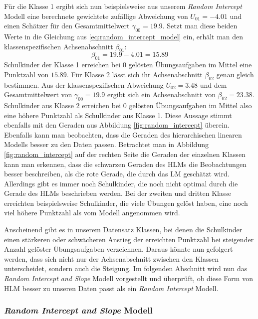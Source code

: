 \documentclass[12pt]{article}\usepackage[]{graphicx}\usepackage[]{color}
\begin{document}
Für die Klasse 1 ergibt sich nun beispielsweise aus unserem \textit{Random Intercept} Modell eine berechnete gewichtete zufällige Abweichung von $U_{01} = -4.01$ und einen Schätzer für den Gesamtmittelwert $\gamma_{00} = 19.9$. Setzt man diese beiden Werte in die Gleichung aus \eqref{eq:random_intercept_model} ein, erhält man den klassenspezifischen Achsenabschnitt $\beta_{01}$:
\begin{equation}
\beta_{01} = 19.9 - 4.01 = 15.89
\end{equation} 
Schulkinder der Klasse 1 erreichen bei $0$ gelösten Übungsaufgaben im Mittel eine Punktzahl von $15.89$. Für Klasse 2 lässt sich ihr Achsenabschnitt $\beta_{02}$ genau gleich bestimmen. Aus der klassenspezifischen Abweichung $U_{02} = 3.48$ und dem Gesamtmittelwert von $\gamma_{00} = 19.9$ ergibt sich ein Achsenabschnitt von $\beta_{02} = 23.38$. Schulkinder aus Klasse 2 erreichen bei 0 gelösten Übungsaufgaben im Mittel also eine höhere Punktzahl als Schulkinder aus Klasse 1. Diese Aussage stimmt ebenfalls mit den Geraden aus Abbildung \ref{fig:random_intercept} überein. Ebenfalls kann man beobachten, dass die Geraden des hierarchischen linearen Modells besser zu den Daten passen. Betrachtet man in Abbildung \ref{fig:random_intercept} auf der rechten Seite die Geraden der einzelnen Klassen kann man erkennen, dass die schwarzen Geraden des HLMs die Beobachtungen besser beschreiben, als die rote Gerade, die durch das LM geschätzt wird. Allerdings gibt es immer noch Schulkinder, die noch nicht optimal durch die Gerade des HLMs beschrieben werden. Bei der zweiten und dritten Klasse erreichten beispielsweise Schulkinder, die viele Übungen gelöst haben, eine noch viel höhere Punktzahl als vom Modell angenommen wird. 

Anscheinend gibt es in unserem Datensatz Klassen, bei denen die Schulkinder einen stärkeren oder schwächeren Anstieg der erreichten Punktzahl bei steigender Anzahl gelöster Übungsaufgaben verzeichnen. Daraus könnte nun gefolgert werden, dass sich nicht nur der Achsenabschnitt zwischen den Klassen unterscheidet, sondern auch die Steigung. Im folgenden Abschnitt wird nun das \textit{Random Intercept and Slope} Modell vorgestellt und überprüft, ob diese Form von HLM besser zu unseren Daten passt als ein \textit{Random Intercept} Modell.

\subsubsection{\textit{Random Intercept and Slope} Modell} \label{section:random_intercept_slope_model}
\end{document}
